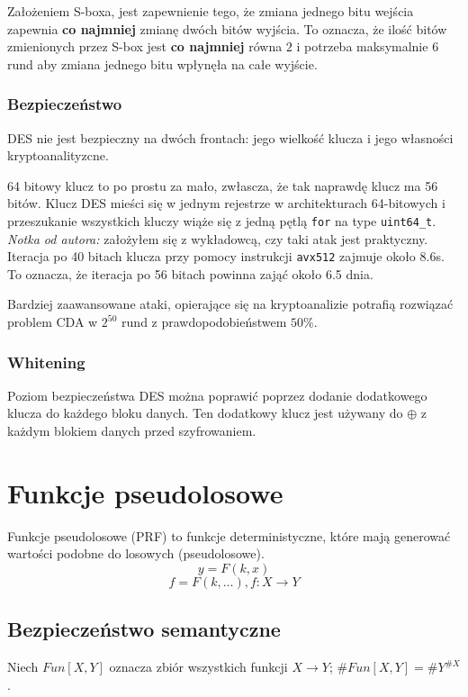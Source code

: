 \documentclass{../notatki}
\begin{document}
Założeniem S-boxa, jest zapewnienie tego, że zmiana jednego bitu
wejścia zapewnia \textbf{co najmniej} zmianę dwóch bitów wyjścia. To oznacza, że
ilość bitów zmienionych przez S-box jest \textbf{co najmniej} równa $2$ i
potrzeba maksymalnie 6 rund aby zmiana jednego bitu wpłynęła na całe wyjście.

\subsubsection{Bezpieczeństwo}

DES nie jest bezpieczny na dwóch frontach: jego wielkość klucza i jego własności
kryptoanalityzcne.

64 bitowy klucz to po prostu za mało, zwłascza, że tak naprawdę
klucz ma 56 bitów. Klucz DES mieści się w jednym rejestrze w
architekturach 64-bitowych i przeszukanie wszystkich kluczy wiąże się
z jedną pętlą \texttt{for} na type \texttt{uint64\_t}. \textit{Notka
od autora:} założyłem się z wykładowcą, czy
taki atak jest praktyczny. Iteracja po 40 bitach klucza przy pomocy instrukcji
\texttt{avx512} zajmuje około 8.6s. To oznacza, że iteracja po 56 bitach powinna
zająć około 6.5 dnia.

Bardziej zaawansowane ataki, opierające się na kryptoanalizie potrafią rozwiązać
problem CDA w $2^{50}$ rund z prawdopodobieństwem $50\%$.

\subsubsection{Whitening}

Poziom bezpieczeństwa DES można poprawić poprzez dodanie dodatkowego klucza
do każdego bloku danych. Ten dodatkowy klucz jest używany do $\oplus$ z każdym
blokiem danych przed szyfrowaniem.

\section{Funkcje pseudolosowe}

Funkcje pseudolosowe (PRF) to funkcje deterministyczne, które mają generować
wartości podobne do losowych (pseudolosowe).
$$
y = F(k, x)
$$
$$
f = F(k, \dots), f: X \rightarrow Y
$$

\subsection{Bezpieczeństwo semantyczne}

Niech $Fun[X, Y]$ oznacza zbiór wszystkich funkcji $X \rightarrow Y$;
$\#Fun[X, Y] = \#Y^{\#X}$.
\end{document}
